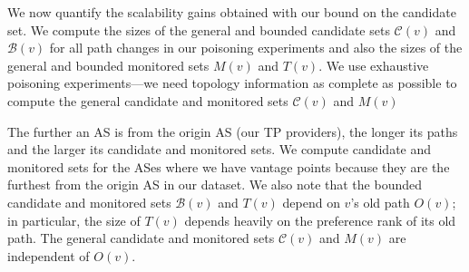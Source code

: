  We now quantify the
scalability gains obtained with our bound on the candidate set.  We
compute the sizes of the general and bounded candidate sets
$\mathcal{C}(v)$ and $\mathcal{B}(v)$ for all path changes in our
poisoning experiments and also the sizes of the general and bounded
monitored sets $M(v)$ and $T(v)$.  We use exhaustive poisoning
experiments---we need topology information as complete as possible to
compute the general candidate and monitored sets $\mathcal{C}(v)$ and $M(v)$

The further an AS is from the origin AS (\ie our TP providers), the
longer its paths and the larger its candidate and monitored sets.  We
compute candidate and monitored sets for the ASes where we have vantage
points because they are the furthest from the origin AS in our dataset.
We also note that the bounded candidate and monitored sets
$\mathcal{B}(v)$ and $T(v)$ depend on $v$'s old path $O(v)$; in
particular, the size of $T(v)$ depends heavily on the preference rank of
its old path.  The general candidate and monitored sets $\mathcal{C}(v)$
and $M(v)$ are independent of $O(v)$.

